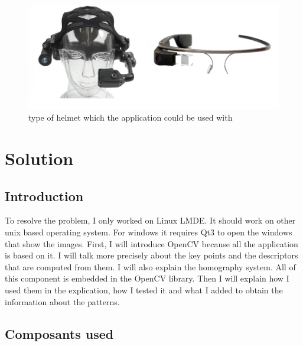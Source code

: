 \documentclass[english,a4paper,11pt]{report}
\begin{document}
		\begin{figure}[h]
			\begin{center}
				\includegraphics[scale=0.41]{images_not_compressed/helmet.png}
				\caption{type of helmet which the application could be used with}
			\end{center}
		\end{figure}
	
		
	\chapter{Solution}
	\section{Introduction}
	\par To resolve the problem, I only worked on Linux LMDE. It should work on other unix based operating system. For windows it requires Qt3 to open the windows that show the images.
First, I will introduce OpenCV because all the application is based on it. I will talk more precisely about the key points and the descriptors that are computed from them. I will also explain the homography system. All of this component is embedded in the OpenCV library.
Then I will explain how I used them in the explication, how I tested it and what I added to obtain the information about the patterns.
	
	\section{Composants used}
	
\end{document}
